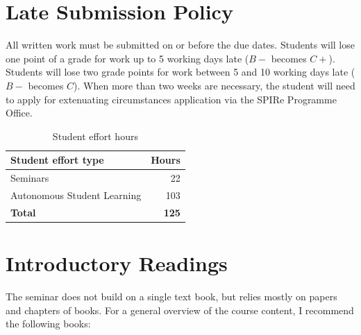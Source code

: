 \documentclass[abstract=on,parskip=full,headings=standardclasses,fontsize=11pt,paper=a4]{scrartcl}
\begin{document}
\section*{Late Submission Policy}

All written work must be submitted on or before the due dates. Students will lose one point of a grade for work up to 5 working days late ($B-$ becomes $C+$). Students will lose two grade points for work between 5 and 10 working days late ($B-$ becomes $C$). When more than two weeks are necessary, the student will need to apply for extenuating circumstances application via the SPIRe Programme Office.

\begin{table}[h] \centering \onehalfspacing
\caption*{Student effort hours}
\begin{tabular}{ l r} 
\toprule
Student effort type &  Hours \\
\midrule
Seminars & 22 \\
Autonomous Student Learning  & 103 \\
\textbf{Total} & \textbf{125} \\
\bottomrule
\end{tabular}
\end{table}



\section*{Introductory Readings}

The seminar does not build on a single text book, but relies mostly on papers and chapters of books. For  a general overview of the course content, I recommend the following books:
\end{document}
